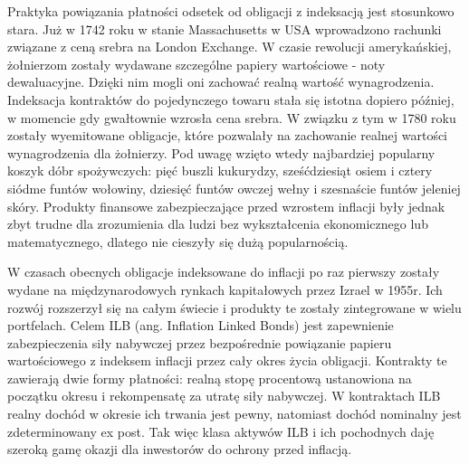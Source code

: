 \documentclass{mini}
\theoremstyle{mythstyle}
\begin{document}
	Praktyka powiązania płatności odsetek od obligacji z indeksacją jest stosunkowo stara. Już w 1742 roku w stanie Massachusetts w USA wprowadzono rachunki związane z ceną srebra na London Exchange. W czasie rewolucji amerykańskiej, żołnierzom zostały wydawane szczególne papiery wartościowe -  noty dewaluacyjne. Dzięki nim mogli oni zachować realną wartość wynagrodzenia. Indeksacja kontraktów do pojedynczego towaru stała się istotna dopiero później, w momencie gdy gwałtownie wzrosła cena srebra. W związku z tym w 1780 roku zostały wyemitowane obligacje, które pozwalały na zachowanie realnej wartości wynagrodzenia dla żołnierzy. Pod uwagę wzięto wtedy najbardziej popularny koszyk dóbr spożywczych: pięć buszli kukurydzy, sześćdziesiąt osiem i cztery siódme funtów wołowiny, dziesięć funtów owczej wełny i szesnaście funtów jeleniej skóry. Produkty finansowe zabezpieczające przed wzrostem inflacji były jednak zbyt trudne dla zrozumienia dla ludzi bez wykształcenia ekonomicznego lub matematycznego, dlatego nie cieszyły się dużą popularnością.
		
	W czasach obecnych obligacje indeksowane do inflacji po raz pierwszy zostały wydane na międzynarodowych rynkach kapitałowych przez Izrael w 1955r. Ich rozwój rozszerzył się na całym świecie i produkty te zostały zintegrowane w wielu portfelach. Celem ILB (ang. Inflation Linked Bonds) jest zapewnienie zabezpieczenia siły nabywczej przez bezpośrednie powiązanie papieru wartościowego z indeksem inflacji przez cały okres życia obligacji. Kontrakty te zawierają dwie formy płatności: realną stopę procentową ustanowiona na początku okresu i rekompensatę za utratę siły nabywczej. W kontraktach ILB realny dochód w okresie ich trwania jest pewny, natomiast dochód nominalny jest zdeterminowany ex post. Tak więc klasa aktywów ILB i ich pochodnych daję szeroką gamę okazji dla inwestorów do ochrony przed inflacją.  
		
\end{document}
